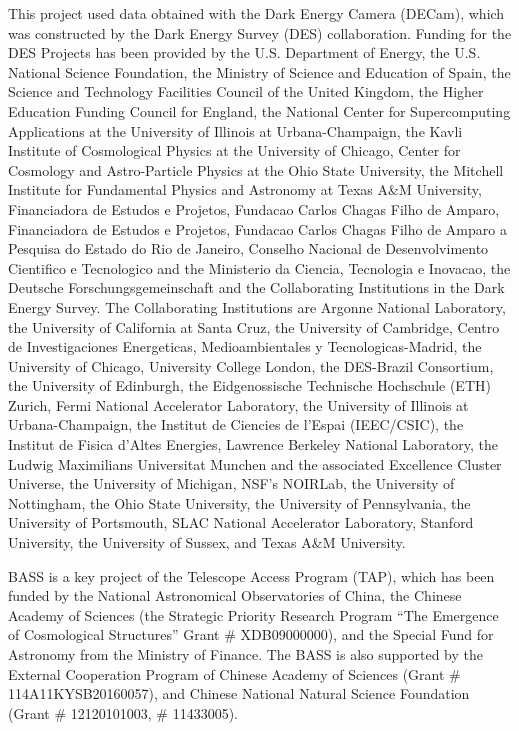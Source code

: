 \documentclass[twocolumn,linenumbers]{aastex631}
\begin{document}
This project used data obtained with the Dark Energy Camera (DECam), which was constructed by the Dark Energy Survey (DES) collaboration. Funding for the DES Projects has been provided by the U.S. Department of Energy, the U.S. National Science Foundation, the Ministry of Science and Education of Spain, the Science and Technology Facilities Council of the United Kingdom, the Higher Education Funding Council for England, the National Center for Supercomputing Applications at the University of Illinois at Urbana-Champaign, the Kavli Institute of Cosmological Physics at the University of Chicago, Center for Cosmology and Astro-Particle Physics at the Ohio State University, the Mitchell Institute for Fundamental Physics and Astronomy at Texas A\&M University, Financiadora de Estudos e Projetos, Fundacao Carlos Chagas Filho de Amparo, Financiadora de Estudos e Projetos, Fundacao Carlos Chagas Filho de Amparo a Pesquisa do Estado do Rio de Janeiro, Conselho Nacional de Desenvolvimento Cientifico e Tecnologico and the Ministerio da Ciencia, Tecnologia e Inovacao, the Deutsche Forschungsgemeinschaft and the Collaborating Institutions in the Dark Energy Survey. The Collaborating Institutions are Argonne National Laboratory, the University of California at Santa Cruz, the University of Cambridge, Centro de Investigaciones Energeticas, Medioambientales y Tecnologicas-Madrid, the University of Chicago, University College London, the DES-Brazil Consortium, the University of Edinburgh, the Eidgenossische Technische Hochschule (ETH) Zurich, Fermi National Accelerator Laboratory, the University of Illinois at Urbana-Champaign, the Institut de Ciencies de l’Espai (IEEC/CSIC), the Institut de Fisica d’Altes Energies, Lawrence Berkeley National Laboratory, the Ludwig Maximilians Universitat Munchen and the associated Excellence Cluster Universe, the University of Michigan, NSF’s NOIRLab, the University of Nottingham, the Ohio State University, the University of Pennsylvania, the University of Portsmouth, SLAC National Accelerator Laboratory, Stanford University, the University of Sussex, and Texas A\&M University.

BASS is a key project of the Telescope Access Program (TAP), which has been funded by the National Astronomical Observatories of China, the Chinese Academy of Sciences (the Strategic Priority Research Program “The Emergence of Cosmological Structures” Grant \# XDB09000000), and the Special Fund for Astronomy from the Ministry of Finance. The BASS is also supported by the External Cooperation Program of Chinese Academy of Sciences (Grant \# 114A11KYSB20160057), and Chinese National Natural Science Foundation (Grant \# 12120101003, \# 11433005).
\end{document}
